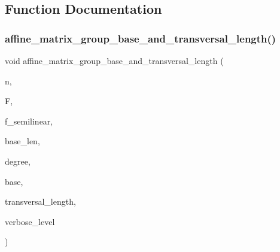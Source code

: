 \subsection{Function Documentation}
\mbox{\label{group__generators_8_c_a947965c22c62e4e04c54c9fe267d63ab}} 
\subsubsection{\texorpdfstring{affine\+\_\+matrix\+\_\+group\+\_\+base\+\_\+and\+\_\+transversal\+\_\+length()}{affine\_matrix\_group\_base\_and\_transversal\_length()}}
{\footnotesize\ttfamily void affine\+\_\+matrix\+\_\+group\+\_\+base\+\_\+and\+\_\+transversal\+\_\+length (\begin{DoxyParamCaption}\item[{\mbox{\hyperlink{galois_8h_a09fddde158a3a20bd2dcadb609de11dc}{I\+NT}}}]{n,  }\item[{\mbox{\hyperlink{classfinite__field}{finite\+\_\+field}} $\ast$}]{F,  }\item[{\mbox{\hyperlink{galois_8h_a09fddde158a3a20bd2dcadb609de11dc}{I\+NT}}}]{f\+\_\+semilinear,  }\item[{\mbox{\hyperlink{galois_8h_a09fddde158a3a20bd2dcadb609de11dc}{I\+NT}}}]{base\+\_\+len,  }\item[{\mbox{\hyperlink{galois_8h_a09fddde158a3a20bd2dcadb609de11dc}{I\+NT}}}]{degree,  }\item[{\mbox{\hyperlink{galois_8h_a09fddde158a3a20bd2dcadb609de11dc}{I\+NT}} $\ast$}]{base,  }\item[{\mbox{\hyperlink{galois_8h_a09fddde158a3a20bd2dcadb609de11dc}{I\+NT}} $\ast$}]{transversal\+\_\+length,  }\item[{\mbox{\hyperlink{galois_8h_a09fddde158a3a20bd2dcadb609de11dc}{I\+NT}}}]{verbose\+\_\+level }\end{DoxyParamCaption})}

\mbox{\label{group__generators_8_c_a93cea3dda589762adb117d07d0de39de}} 
